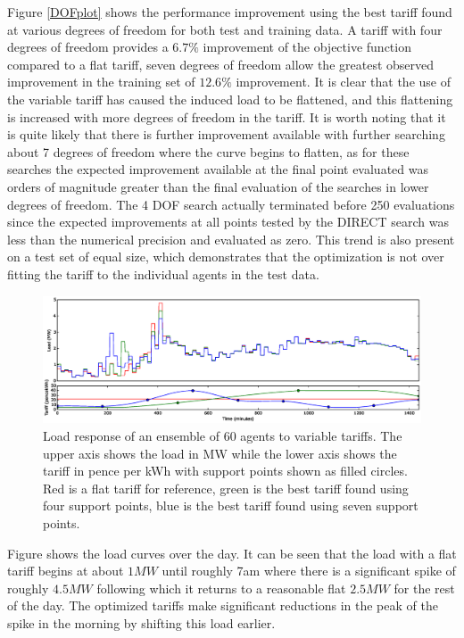\documentclass[a4paper, 10 pt, conference]{ieeeconf}  %
\begin{document}
Figure \ref{DOFplot} shows the performance improvement using the best tariff found at various degrees of freedom for both test and training data. A tariff with four degrees of freedom provides a $6.7\%$ improvement of the objective function compared to a flat tariff, seven degrees of freedom allow the greatest observed improvement in the training set of $12.6\%$ improvement. It is clear that the use of the variable tariff has caused the induced load to be flattened, and this flattening is increased with more degrees of freedom in the tariff. It is worth noting that it is quite likely that there is further improvement available with further searching about 7 degrees of freedom where the curve begins to flatten, as for these searches the expected improvement available at the final point evaluated was orders of magnitude greater than the final evaluation of the searches in lower degrees of freedom. The 4 DOF search actually terminated before 250 evaluations since the expected improvements at all points tested by the DIRECT search was less than the numerical precision and evaluated as zero. This trend is also present on a test set of equal size, which demonstrates that the optimization is not over fitting the tariff to the individual agents in the test data. 

\begin{figure}[htb]
\centering
\includegraphics[width=\textwidth,trim =4cm 12cm 4cm 2cm,clip=True]{f1.eps}
\caption{Load response of an ensemble of 60 agents to variable tariffs. The upper axis shows the load in MW while the lower axis shows the tariff in pence per kWh with support points shown as filled circles. Red is a flat tariff for reference, green is the best tariff found using four support points, blue is the best tariff found using seven support points.}
\label{loadcurve}
\end{figure}

Figure \cite{loadcurve} shows the load curves over the day. It can be seen that the load with a flat tariff begins at about $1MW$ until roughly 7am where there is a significant spike of roughly $4.5MW$ following which it returns to a reasonable flat $2.5MW$ for the rest of the day. The optimized tariffs make significant reductions in the peak of the spike in the morning  by shifting this load earlier.
\end{document}
